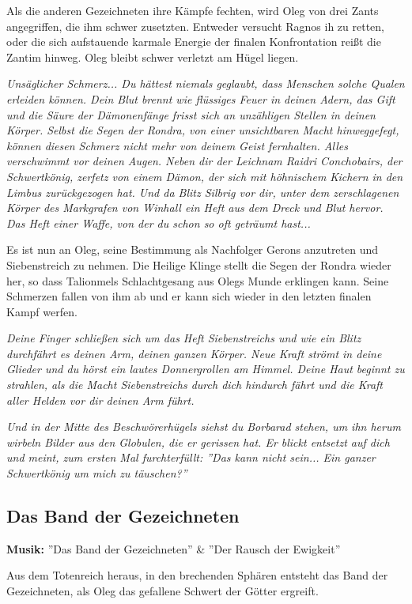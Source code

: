 Als die anderen Gezeichneten ihre Kämpfe fechten, wird Oleg von drei Zants angegriffen, die ihm schwer zusetzten. Entweder versucht Ragnos ih zu retten, oder die sich aufstauende karmale Energie der finalen Konfrontation reißt die Zantim hinweg. Oleg bleibt schwer verletzt am Hügel liegen. 

\emph{Unsäglicher Schmerz... Du hättest niemals geglaubt, dass Menschen solche Qualen erleiden können. Dein Blut brennt wie flüssiges Feuer in deinen Adern, das Gift und die Säure der Dämonenfänge frisst sich an unzähligen Stellen in deinen Körper. Selbst die Segen der Rondra, von einer unsichtbaren Macht hinweggefegt, können diesen Schmerz nicht mehr von deinem Geist fernhalten. Alles verschwimmt vor deinen Augen. Neben dir der Leichnam Raidri Conchobairs, der Schwertkönig, zerfetz von einem Dämon, der sich mit höhnischem Kichern in den Limbus zurückgezogen hat. Und da Blitz Silbrig vor dir, unter dem zerschlagenen Körper des Markgrafen von Winhall ein Heft aus dem Dreck und Blut hervor. Das Heft einer Waffe, von der du schon so oft geträumt hast...}

Es ist nun an Oleg, seine Bestimmung als Nachfolger Gerons anzutreten und Siebenstreich zu nehmen. Die Heilige Klinge stellt die Segen der Rondra wieder her, so dass Talionmels Schlachtgesang aus Olegs Munde erklingen kann. Seine Schmerzen fallen von ihm ab und er kann sich wieder in den letzten finalen Kampf werfen.

\emph{Deine Finger schließen sich um das Heft Siebenstreichs und wie ein Blitz durchfährt es deinen Arm, deinen ganzen Körper. Neue Kraft strömt in deine Glieder und du hörst ein lautes Donnergrollen am Himmel. Deine Haut beginnt zu strahlen, als die Macht Siebenstreichs durch dich hindurch fährt und die Kraft aller Helden vor dir deinen Arm führt.}

\emph{Und in der Mitte des Beschwörerhügels siehst du Borbarad stehen, um ihn herum wirbeln Bilder aus den Globulen, die er gerissen hat. Er blickt entsetzt auf dich und meint, zum ersten Mal furchterfüllt: ''Das kann nicht sein... Ein ganzer Schwertkönig um mich zu täuschen?''}

\subsection{Das Band der Gezeichneten}
\textbf{Musik:} ''Das Band der Gezeichneten'' \&  ''Der Rausch der Ewigkeit''

Aus dem Totenreich heraus, in den brechenden Sphären entsteht das Band der Gezeichneten, als Oleg das gefallene Schwert der Götter ergreift.

